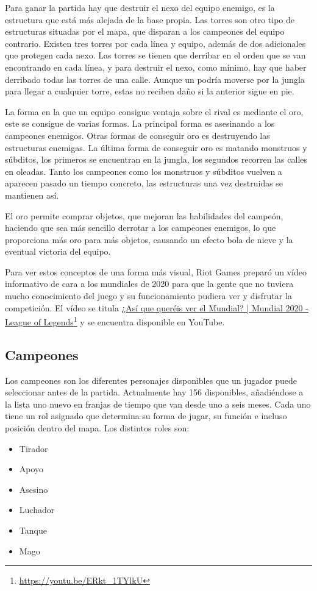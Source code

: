 Para ganar la partida hay que destruir el nexo del equipo enemigo, es la estructura que está más alejada de la base propia. Las torres son otro tipo de estructuras situadas por el mapa, que disparan a los campeones del equipo contrario. Existen tres torres por cada línea y equipo, además de dos adicionales que protegen cada nexo. Las torres se tienen que derribar en el orden que se van encontrando en cada línea, y para destruir el nexo, como mínimo, hay que haber derribado todas las torres de una calle. Aunque un podría moverse por la jungla para llegar a cualquier torre, estas no reciben daño si la anterior sigue en pie.

La forma en la que un equipo consigue ventaja sobre el rival es mediante el oro, este se consigue de varias formas. La principal forma es asesinando a los campeones enemigos. Otras formas de conseguir oro es destruyendo las estructuras enemigas. La última forma de conseguir oro es matando monstruos y súbditos, los primeros se encuentran en la jungla, los segundos recorren las calles en oleadas. Tanto los campeones como los monstruos y súbditos vuelven a aparecen pasado un tiempo concreto, las estructuras una vez destruidas se mantienen así.

El oro permite comprar objetos, que mejoran las habilidades del campeón, haciendo que sea más sencillo derrotar a los campeones enemigos, lo que proporciona más oro para más objetos, causando un efecto bola de nieve y la eventual victoria del equipo.

Para ver estos conceptos de una forma más visual, Riot Games preparó un vídeo informativo de cara a los mundiales de 2020 para que la gente que no tuviera mucho conocimiento del juego y su funcionamiento pudiera ver y disfrutar la competición. El vídeo se titula \href{https://www.youtube.com/watch?v=ERkt_1TYlkU}{¿Así que queréis ver el Mundial? | Mundial 2020 - League of Legends}\footnote{\url{https://youtu.be/ERkt_1TYlkU}} y se encuentra disponible en YouTube.


\subsection{Campeones}
Los campeones son los diferentes personajes disponibles que un jugador puede seleccionar antes de la partida. Actualmente hay 156 disponibles, añadiéndose a la lista uno nuevo en franjas de tiempo que van desde uno a seis meses. Cada uno tiene un rol asignado que determina su forma de jugar, su función e incluso posición dentro del mapa. Los distintos roles son:
\begin{itemize}
	\tightlist
	\item Tirador
	\item Apoyo
	\item Asesino
	\item Luchador
	\item Tanque
	\item Mago
\end{itemize}

